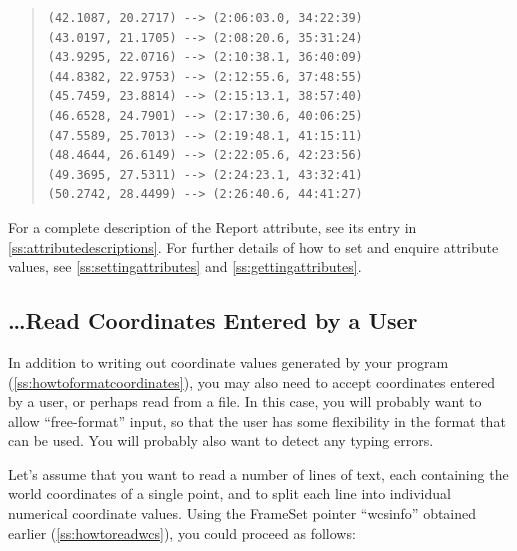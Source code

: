 \documentclass[twoside,11pt]{article}
\newcommand{\htmlref}[2]{#1}
\newcommand{\appref}[1]{Appendix~\ref{#1}}
\newcommand{\secref}[1]{\S\ref{#1}}
\renewcommand{\appref}[1]{\ref{#1}}
\renewcommand{\secref}[1]{\ref{#1}}
\begin{document}
\begin{quote}
\begin{verbatim}
(42.1087, 20.2717) --> (2:06:03.0, 34:22:39)
(43.0197, 21.1705) --> (2:08:20.6, 35:31:24)
(43.9295, 22.0716) --> (2:10:38.1, 36:40:09)
(44.8382, 22.9753) --> (2:12:55.6, 37:48:55)
(45.7459, 23.8814) --> (2:15:13.1, 38:57:40)
(46.6528, 24.7901) --> (2:17:30.6, 40:06:25)
(47.5589, 25.7013) --> (2:19:48.1, 41:15:11)
(48.4644, 26.6149) --> (2:22:05.6, 42:23:56)
(49.3695, 27.5311) --> (2:24:23.1, 43:32:41)
(50.2742, 28.4499) --> (2:26:40.6, 44:41:27)
\end{verbatim}
\end{quote}

For a complete description of the Report attribute, see its entry in
\appref{ss:attributedescriptions}.  For further details of how to set
and enquire attribute values, see \secref{ss:settingattributes} and
\secref{ss:gettingattributes}.

\subsection{\ldots Read Coordinates Entered by a User}

In addition to writing out coordinate values generated by your program
(\secref{ss:howtoformatcoordinates}), you may also need to accept
coordinates entered by a user, or perhaps read from a file. In this
case, you will probably want to allow ``free-format'' input, so that
the user has some flexibility in the format that can be used. You will
probably also want to detect any typing errors.

Let's assume that you want to read a number of lines of text, each
containing the world coordinates of a single point, and to split each
line into individual numerical coordinate values. Using the \htmlref{FrameSet}{FrameSet}
pointer ``wcsinfo'' obtained earlier (\secref{ss:howtoreadwcs}), you
could proceed as follows:
\end{document}
